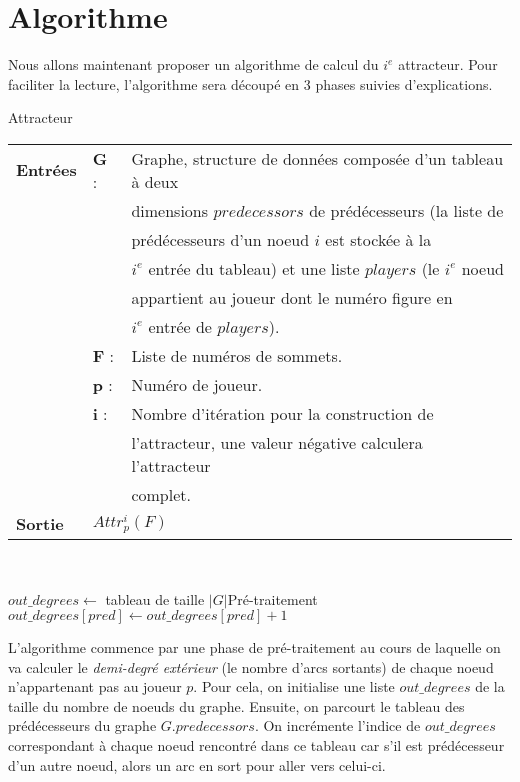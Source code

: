 \documentclass[12pt,a4paper,oneside,titlepage]{report}
\begin{document}
\section{Algorithme}
Nous allons maintenant proposer un algorithme de calcul du $i^e$ attracteur. Pour faciliter la lecture, l'algorithme sera découpé en 3 phases suivies d'explications.
\begin{algorithm}[H]
\caption{Attracteur}\label{attractor}
\hspace*{\algorithmicindent} 
\begin{tabular}{lll}
	\textbf{Entrées} & \textbf{G} : &Graphe, structure de données composée d'un tableau à deux\\
	&&dimensions $predecessors$ de prédécesseurs (la liste de \\
	&&prédécesseurs d'un noeud $i$ est stockée à la \\
	&&$i^e$ entrée du tableau) et une liste $players$ (le $i^e$ noeud\\
	&&appartient au joueur dont le numéro figure en \\
	&&$i^e$ entrée de $players$).\\
	&\textbf{F} : &Liste de numéros de sommets.\\
	&\textbf{p} : &Numéro de joueur.\\
	&\textbf{i} : &Nombre d'itération pour la construction de\\
	&&l'attracteur, une valeur négative calculera l'attracteur\\
	&&complet.\\
	\textbf{Sortie} &\multicolumn{2}{l}{$Attr_p^i(F)$}\\
\end{tabular}\\
\begin{algorithmic}[1]
	\State $out\_degrees \gets$ tableau de taille $|G|$\Comment Pré-traitement
				\State $out\_degrees[pred] \gets out\_degrees[pred]+1$
			\EndFor
		\EndIf
	\EndFor
{}
\end{algorithmic}
\end{algorithm}
L'algorithme commence par une phase de pré-traitement au cours de laquelle on va calculer le \emph{demi-degré extérieur} (le nombre d'arcs sortants) de chaque noeud n'appartenant pas au joueur $p$. Pour cela, on initialise une liste $out\_degrees$ de la taille du nombre de noeuds du graphe. Ensuite, on parcourt le tableau des prédécesseurs du graphe $G.predecessors$. On incrémente l'indice de $out\_degrees$ correspondant à chaque noeud rencontré dans ce tableau car s'il est prédécesseur d'un autre noeud, alors un arc en sort pour aller vers celui-ci.
\end{document}
